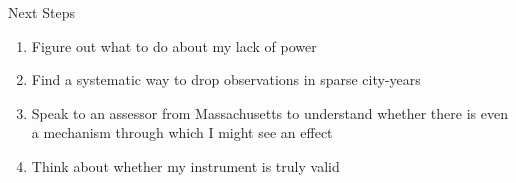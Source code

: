 \documentclass [xcolor=svgnames, t] {beamer}
\begin{document}
\begin{frame}{Next Steps}
    \begin{enumerate}
        \item Figure out what to do about my lack of power
        \item Find a systematic way to drop observations in sparse city-years
        \item Speak to an assessor from Massachusetts to understand whether there is even a mechanism through which I might see an effect
        \item Think about whether my instrument is truly valid
    \end{enumerate}
\end{frame}
\end{document}
